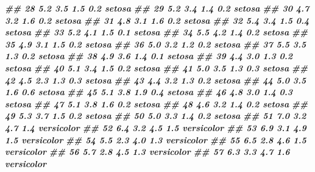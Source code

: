 \documentclass[
]{book}
\newenvironment{Shaded}{\begin{snugshade}}{\end{snugshade}}
\newcommand{\DocumentationTok}[1]{\textcolor[rgb]{0.56,0.35,0.01}{\textbf{\textit{#1}}}}
\begin{document}
\begin{Shaded}
\begin{Highlighting}[]
\DocumentationTok{\#\# 28           5.2         3.5          1.5         0.2     setosa}
\DocumentationTok{\#\# 29           5.2         3.4          1.4         0.2     setosa}
\DocumentationTok{\#\# 30           4.7         3.2          1.6         0.2     setosa}
\DocumentationTok{\#\# 31           4.8         3.1          1.6         0.2     setosa}
\DocumentationTok{\#\# 32           5.4         3.4          1.5         0.4     setosa}
\DocumentationTok{\#\# 33           5.2         4.1          1.5         0.1     setosa}
\DocumentationTok{\#\# 34           5.5         4.2          1.4         0.2     setosa}
\DocumentationTok{\#\# 35           4.9         3.1          1.5         0.2     setosa}
\DocumentationTok{\#\# 36           5.0         3.2          1.2         0.2     setosa}
\DocumentationTok{\#\# 37           5.5         3.5          1.3         0.2     setosa}
\DocumentationTok{\#\# 38           4.9         3.6          1.4         0.1     setosa}
\DocumentationTok{\#\# 39           4.4         3.0          1.3         0.2     setosa}
\DocumentationTok{\#\# 40           5.1         3.4          1.5         0.2     setosa}
\DocumentationTok{\#\# 41           5.0         3.5          1.3         0.3     setosa}
\DocumentationTok{\#\# 42           4.5         2.3          1.3         0.3     setosa}
\DocumentationTok{\#\# 43           4.4         3.2          1.3         0.2     setosa}
\DocumentationTok{\#\# 44           5.0         3.5          1.6         0.6     setosa}
\DocumentationTok{\#\# 45           5.1         3.8          1.9         0.4     setosa}
\DocumentationTok{\#\# 46           4.8         3.0          1.4         0.3     setosa}
\DocumentationTok{\#\# 47           5.1         3.8          1.6         0.2     setosa}
\DocumentationTok{\#\# 48           4.6         3.2          1.4         0.2     setosa}
\DocumentationTok{\#\# 49           5.3         3.7          1.5         0.2     setosa}
\DocumentationTok{\#\# 50           5.0         3.3          1.4         0.2     setosa}
\DocumentationTok{\#\# 51           7.0         3.2          4.7         1.4 versicolor}
\DocumentationTok{\#\# 52           6.4         3.2          4.5         1.5 versicolor}
\DocumentationTok{\#\# 53           6.9         3.1          4.9         1.5 versicolor}
\DocumentationTok{\#\# 54           5.5         2.3          4.0         1.3 versicolor}
\DocumentationTok{\#\# 55           6.5         2.8          4.6         1.5 versicolor}
\DocumentationTok{\#\# 56           5.7         2.8          4.5         1.3 versicolor}
\DocumentationTok{\#\# 57           6.3         3.3          4.7         1.6 versicolor}

\end{Highlighting}
\end{Shaded}
\end{document}
